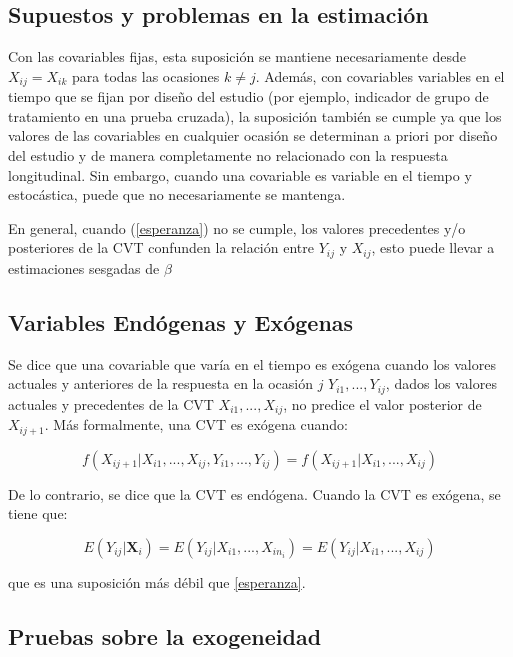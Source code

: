 \documentclass[12pt]{article}
\def\cvt{covariable que varía en el tiempo}
\def\xseqj{$X_{i1}, ..., X_{ij}$}
\def\yseqj{$Y_{i1}, ..., Y_{ij}$}
\begin{document}
\subsection{Supuestos y problemas en la estimación}

Con las covariables fijas, esta suposición se mantiene necesariamente desde $X_{ij} = X_{ik}$ para todas las ocasiones
$k \neq j$. Además, con covariables variables en el tiempo que se fijan por diseño del estudio (por ejemplo, indicador
de grupo de tratamiento en una prueba cruzada), la suposición también se cumple ya que los valores de las covariables
en cualquier ocasión se determinan a priori por diseño del estudio y de manera completamente no relacionado con la
respuesta longitudinal. Sin embargo, cuando una covariable es variable en el tiempo y estocástica, puede que no
necesariamente se mantenga.

En general, cuando (\ref{esperanza}) no se cumple, los valores precedentes y/o posteriores de la CVT confunden la
relación entre $Y_{ij}$ y $X_{ij}$, esto puede llevar a estimaciones sesgadas de $\beta$

\subsection{Variables Endógenas y Exógenas}

Se dice que una \cvt{} es exógena cuando los valores actuales y anteriores de la respuesta en la ocasión
$j$ \yseqj{}, dados los valores actuales y precedentes de la CVT \xseqj{}, no predice el valor
posterior de $X_{ij+1}$. Más formalmente, una CVT es exógena cuando:

\begin{equation}
\label{exogeneidad}
	f(X_{ij+1}|X_{i1}, ..., X_{ij}, Y_{i1}, ..., Y_{ij}) = f(X_{ij+1}|X_{i1}, ..., X_{ij})
\end{equation}

De lo contrario, se dice que la CVT es endógena. Cuando la CVT es exógena, se tiene que:

\begin{equation}
\label{exogeneidad_debil}
	E(Y_{ij}|\bm{X}_i) = E(Y_{ij}|X_{i1}, ..., X_{in_i}) = E(Y_{ij}|X_{i1}, ..., X_{ij})
\end{equation}

que es una suposición más débil que \ref{esperanza}.

\subsection{Pruebas sobre la exogeneidad}
\end{document}
